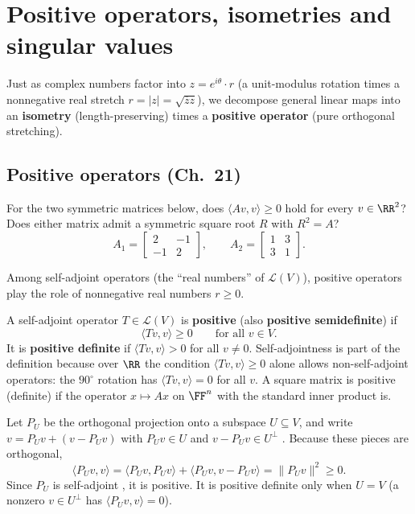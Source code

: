 \documentclass[10pt]{scrartcl}
\newcommand{\LL}{\mathcal L}\newcommand{\PP}{\mathcal P}\newcommand{\MM}{\mathcal M}
\begin{document}
\section{Positive operators, isometries and singular values}

Just as complex numbers factor into $z = e^{i\theta}\cdot r$ (a unit-modulus rotation times a nonnegative real stretch $r=|z|=\sqrt{\overline{z}z}$), we decompose general linear maps into an \textbf{isometry} (length-preserving) times a \textbf{positive operator} (pure orthogonal stretching).

\subsection{Positive operators (Ch.~21)}

\begin{qbox}
  For the two symmetric matrices below, does $\langle Av,v\rangle\ge0$ hold for every $v\in\RR^2$? Does either matrix admit a symmetric square root $R$ with $R^2=A$?
  \[
    A_1 = \begin{bmatrix}2&-1\\-1&2\end{bmatrix}, \qquad
    A_2 = \begin{bmatrix}1&3\\3&1\end{bmatrix}.
  \]
\end{qbox}

Among self-adjoint operators (the ``real numbers'' of $\LL(V)$), positive operators play the role of nonnegative real numbers $r\ge0$.

\begin{definition*}
  A self-adjoint operator $T\in\LL(V)$ is \textbf{positive} (also \textbf{positive semidefinite}) if
  \[
    \langle Tv,v\rangle \ge 0 \qquad \text{for all } v\in V.
  \]
  It is \textbf{positive definite} if $\langle Tv,v\rangle > 0$ for all $v\neq0$. Self-adjointness is part of the definition because over $\RR$ the condition $\langle Tv,v\rangle\ge0$ alone allows non-self-adjoint operators: the $90^\circ$ rotation has $\langle Tv,v\rangle=0$ for all $v$. A square matrix is positive (definite) if the operator $x\mapsto Ax$ on $\FF^n$ with the standard inner product is.
\end{definition*}

\begin{example*}
  Let $P_U$ be the orthogonal projection onto a subspace $U\subseteq V$, and write $v=P_Uv+(v-P_Uv)$ with $P_Uv\in U$ and $v-P_Uv\in U^\perp$ . Because these pieces are orthogonal,
  \[
    \langle P_U v,v\rangle = \langle P_Uv,P_Uv\rangle + \langle P_Uv,v-P_Uv\rangle = \|P_Uv\|^2 \ge 0.
  \]
  Since $P_U$ is self-adjoint , it is positive. It is positive definite only when $U=V$ (a nonzero $v\in U^\perp$ has $\langle P_Uv,v\rangle=0$).
\end{example*}
\end{document}
